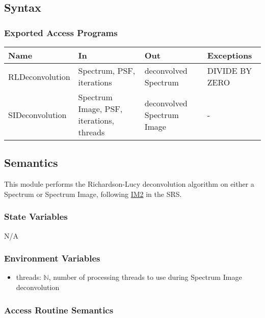 \documentclass[12pt, titlepage]{article}
\begin{document}
\subsection{Syntax}

\subsubsection{Exported Access Programs}

\begin{center}
    \begin{tabular}{p{4cm} p{4cm} p{4cm} p{2cm}}
        \hline
        \textbf{Name} & \textbf{In} & \textbf{Out} & \textbf{Exceptions} \\
        \hline
        RLDeconvolution & Spectrum, PSF, iterations & deconvolved Spectrum & DIVIDE BY
        ZERO \\
        SIDeconvolution & Spectrum Image, PSF, iterations, threads & deconvolved
        Spectrum Image & - \\
        \hline
    \end{tabular}
\end{center}

\subsection{Semantics}
This module performs the Richardson-Lucy deconvolution algorithm on either a
Spectrum or Spectrum Image, following \hyperref[deconvolution]{IM2} in the
SRS. 

\subsubsection{State Variables}
N/A

\subsubsection{Environment Variables}
\begin{itemize}
    \item threads: $\mathbb{N}$, number of processing threads to use during
    Spectrum Image deconvolution
\end{itemize}

\subsubsection{Access Routine Semantics}
\end{document}
